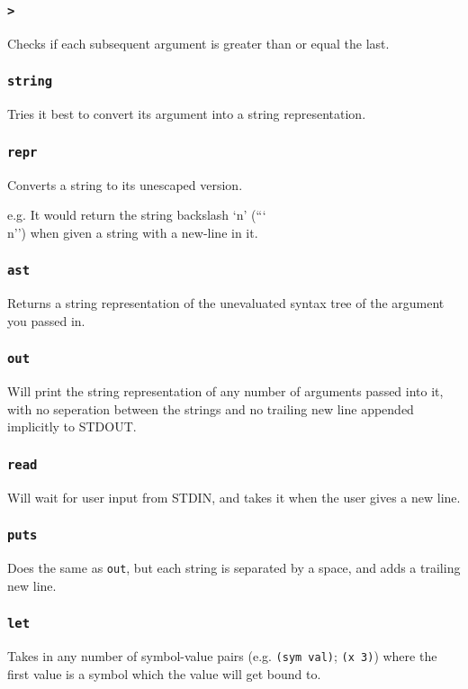 \documentclass{article}
\newcommand{\code}[1]{\texttt{#1}}
\begin{document}
    \subsubsection{\code{>}}
      Checks if each subsequent argument is greater than or equal the last.

    \subsubsection{\code{string}}
      Tries it best to convert its argument into a string
      representation.

    \subsubsection{\code{repr}}
      Converts a string to its unescaped version.

      e.g. It would return the string backslash `n' (``\char`\\n'') when
      given a string with a new-line in it.

    \subsubsection{\code{ast}}
      Returns a string representation of the unevaluated syntax tree
      of the argument you passed in.

    \subsubsection{\code{out}}
      Will print the string representation of any number of arguments
      passed into it, with no seperation between the strings and no
      trailing new line appended implicitly to STDOUT.

    \subsubsection{\code{read}}
      Will wait for user input from STDIN, and takes it when the user gives a
      new line.
    \subsubsection{\code{puts}}
      Does the same as \code{out}, but each string is separated by a space,
      and adds a trailing new line.

    \subsubsection{\code{let}}
      Takes in any number of symbol-value pairs (e.g. \code{(sym val)};
      \code{(x 3)}) where the first value is a symbol which the value will
      get bound to.
\end{document}
